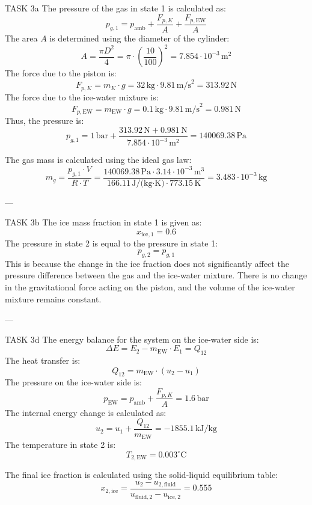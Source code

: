 TASK 3a  
The pressure of the gas in state 1 is calculated as:  
\[
p_{g,1} = p_{\text{amb}} + \frac{F_{p,K}}{A} + \frac{F_{p,\text{EW}}}{A}
\]  
The area \( A \) is determined using the diameter of the cylinder:  
\[
A = \frac{\pi D^2}{4} = \pi \cdot \left(\frac{10}{100}\right)^2 = 7.854 \cdot 10^{-3} \, \text{m}^2
\]  
The force due to the piston is:  
\[
F_{p,K} = m_K \cdot g = 32 \, \text{kg} \cdot 9.81 \, \text{m/s}^2 = 313.92 \, \text{N}
\]  
The force due to the ice-water mixture is:  
\[
F_{p,\text{EW}} = m_{\text{EW}} \cdot g = 0.1 \, \text{kg} \cdot 9.81 \, \text{m/s}^2 = 0.981 \, \text{N}
\]  
Thus, the pressure is:  
\[
p_{g,1} = 1 \, \text{bar} + \frac{313.92 \, \text{N} + 0.981 \, \text{N}}{7.854 \cdot 10^{-3} \, \text{m}^2} = 140069.38 \, \text{Pa}
\]  

The gas mass is calculated using the ideal gas law:  
\[
m_g = \frac{p_{g,1} \cdot V}{R \cdot T} = \frac{140069.38 \, \text{Pa} \cdot 3.14 \cdot 10^{-3} \, \text{m}^3}{166.11 \, \text{J/(kg·K)} \cdot 773.15 \, \text{K}} = 3.483 \cdot 10^{-3} \, \text{kg}
\]  

---

TASK 3b  
The ice mass fraction in state 1 is given as:  
\[
x_{\text{ice},1} = 0.6
\]  
The pressure in state 2 is equal to the pressure in state 1:  
\[
p_{g,2} = p_{g,1}
\]  
This is because the change in the ice fraction does not significantly affect the pressure difference between the gas and the ice-water mixture. There is no change in the gravitational force acting on the piston, and the volume of the ice-water mixture remains constant.  

---

TASK 3d  
The energy balance for the system on the ice-water side is:  
\[
\Delta E = E_2 - m_{\text{EW}} \cdot E_1 = Q_{12}
\]  
The heat transfer is:  
\[
Q_{12} = m_{\text{EW}} \cdot (u_2 - u_1)
\]  
The pressure on the ice-water side is:  
\[
p_{\text{EW}} = p_{\text{amb}} + \frac{F_{p,K}}{A} = 1.6 \, \text{bar}
\]  
The internal energy change is calculated as:  
\[
u_2 = u_1 + \frac{Q_{12}}{m_{\text{EW}}} = -1855.1 \, \text{kJ/kg}
\]  
The temperature in state 2 is:  
\[
T_{2,\text{EW}} = 0.003^\circ \text{C}
\]  

The final ice fraction is calculated using the solid-liquid equilibrium table:  
\[
x_{2,\text{ice}} = \frac{u_2 - u_{2,\text{fluid}}}{u_{\text{fluid},2} - u_{\text{ice},2}} = 0.555
\]